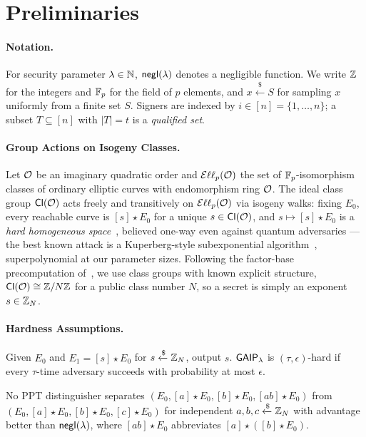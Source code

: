 \section{Preliminaries}
\label{sec:prelims}

\paragraph{Notation.}
For security parameter $\lambda \in \mathbb{N}$, $\mathsf{negl}(\lambda)$ denotes a negligible function. We write $\mathbb{Z}$ for the integers and $\mathbb{F}_p$ for the field of $p$ elements, and $x \xleftarrow{\$} S$ for sampling $x$ uniformly from a finite set $S$. Signers are indexed by $i \in [n] = \{1,\dots,n\}$; a subset $T \subseteq [n]$ with $|T| = t$ is a \emph{qualified set}.

\paragraph{Group Actions on Isogeny Classes.}
Let $\mathcal{O}$ be an imaginary quadratic order and $\mathcal{E}\ell\ell_p(\mathcal{O})$ the set of $\mathbb{F}_p$-isomorphism classes of ordinary elliptic curves with endomorphism ring $\mathcal{O}$. The ideal class group $\mathsf{Cl}(\mathcal{O})$ acts freely and transitively on $\mathcal{E}\ell\ell_p(\mathcal{O})$ via isogeny walks: fixing $E_0$, every reachable curve is $[s]\star E_0$ for a unique $s \in \mathsf{Cl}(\mathcal{O})$, and $s \mapsto [s]\star E_0$ is a \emph{hard homogeneous space}~\cite{sterling2019hhs}, believed one-way even against quantum adversaries --- the best known attack is a Kuperberg-style subexponential algorithm~\cite{ashcombe2020kuperberg}, superpolynomial at our parameter sizes. Following the factor-base precomputation of~\cite{beullens2020csifish}, we use class groups with known explicit structure, $\mathsf{Cl}(\mathcal{O}) \cong \mathbb{Z}/N\mathbb{Z}$ for a public class number $N$, so a secret is simply an exponent $s \in \mathbb{Z}_N$.

\paragraph{Hardness Assumptions.}
\begin{definition}
\label{def:gaip}
Given $E_0$ and $E_1 = [s]\star E_0$ for $s \xleftarrow{\$} \mathbb{Z}_N$, output $s$. $\mathsf{GAIP}_\lambda$ is $(\tau,\epsilon)$-hard if every $\tau$-time adversary succeeds with probability at most $\epsilon$.
\end{definition}

\begin{definition}
\label{def:gaddh}
No PPT distinguisher separates $(E_0,[a]\star E_0,[b]\star E_0,[ab]\star E_0)$ from $(E_0,[a]\star E_0,[b]\star E_0,[c]\star E_0)$ for independent $a,b,c \xleftarrow{\$} \mathbb{Z}_N$ with advantage better than $\mathsf{negl}(\lambda)$, where $[ab]\star E_0$ abbreviates $[a]\star([b]\star E_0)$.
\end{definition}

